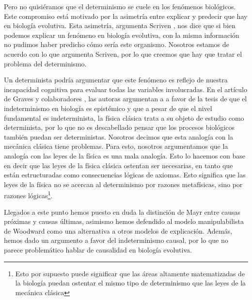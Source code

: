 Pero no quisiéramos que el determinismo se cuele en los fenómenos biológicos. Este compromiso está motivado por la asimetría entre explicar y predecir que hay en biología evolutiva. Esta asimetría, argumenta Scriven \citeyear{Scriven1959}, nos dice que si bien podemos explicar un fenómeno en biología evolutiva, con la misma información no pudimos haber predicho cómo sería este organismo. Nosotros estamos de acuerdo con lo que argumenta Scriven, por lo que creemos que hay que tratar el problema del determinismo.

Un determinista podría argumentar que este fenómeno es reflejo de nuestra incapacidad cognitiva para evaluar todas las variables involucradas. En el artículo de Graves y colaboradores \citeyear{Graves1999}, las autoras argumentan a a favor de la tesis de que el indeterminismo en biología es epistémico y que a pesar de que el nivel fundamental es indeterminista, la física clásica trata  a su objeto de estudio como determinista, por lo que no es descabellado pensar que los procesos biológicos también puedan ser deterministas. Nosotros decimos que esta analogía con la mecánica clásica tiene problemas. Para esto, nosotros argumentamos que la analogía con las leyes de la física es una mala analogía. Esto lo hacemos con base en decir que las leyes de la física clásica ostentan ser necesarias, en tanto que están estructuradas como consecuencias lógicas de axiomas. Esto significa que las leyes de la física no se acercan al determinismo por razones metafísicas, sino por razones lógicas\footnote{Esto por supuesto puede significar que las áreas altamente matematizadas de la biología puedan ostentar el mismo tipo de determinismo que las leyes de la mecánica clásica}.

Llegados a este punto hemos puesto en duda la distinción de Mayr entre causas próximas y causas últimas, asimismo hemos defendido al modelo manipulabilista de Woodward como una alternativa a otros modelos de explicación. Además, hemos dado un argumento a favor del indeterminismo causal, por lo que no parece problemático hablar de causalidad en biología evolutiva.



